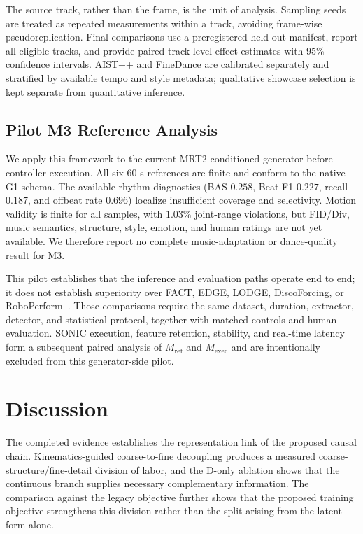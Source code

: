 \documentclass[conference]{IEEEtran}
\begin{document}
The source track, rather than the frame, is the unit of analysis. Sampling seeds are
treated as repeated measurements within a track, avoiding frame-wise
pseudoreplication. Final comparisons use a preregistered held-out manifest, report all
eligible tracks, and provide paired track-level effect estimates with 95\% confidence
intervals. AIST++ and FineDance are calibrated separately and stratified by available
tempo and style metadata; qualitative showcase selection is kept separate from
quantitative inference.

\subsection{Pilot M3 Reference Analysis}
We apply this framework to the current MRT2-conditioned generator before controller
execution. All six 60-s references are finite and conform to the native G1 schema.
The available rhythm diagnostics (BAS $0.258$, Beat F1 $0.227$, recall $0.187$, and
offbeat rate $0.696$) localize insufficient coverage and selectivity. Motion validity
is finite for all samples, with $1.03\%$ joint-range violations, but FID/Div,
music semantics, structure, style, emotion, and human ratings are not yet available.
We therefore report no complete music-adaptation or dance-quality result for M3.

This pilot establishes that the inference and evaluation paths operate end to end; it
does not establish superiority over FACT, EDGE, LODGE, DiscoForcing, or
RoboPerform~\cite{li2021aist,tseng2023edge,li2024lodge,ji2026discoforcing,li2026roboperform}.
Those comparisons require the same dataset, duration, extractor, detector, and
statistical protocol, together with matched controls and human evaluation. SONIC
execution, feature retention, stability, and real-time latency form a subsequent
paired analysis of $M_{\mathrm{ref}}$ and $M_{\mathrm{exec}}$ and are intentionally
excluded from this generator-side pilot.

\section{Discussion}
The completed evidence establishes the representation link of the proposed causal chain. Kinematics-guided coarse-to-fine decoupling produces a measured coarse-structure/fine-detail division of labor, and the D-only ablation shows that the continuous branch supplies necessary complementary information. The comparison against the legacy objective further shows that the proposed training objective strengthens this division rather than the split arising from the latent form alone.
\end{document}
